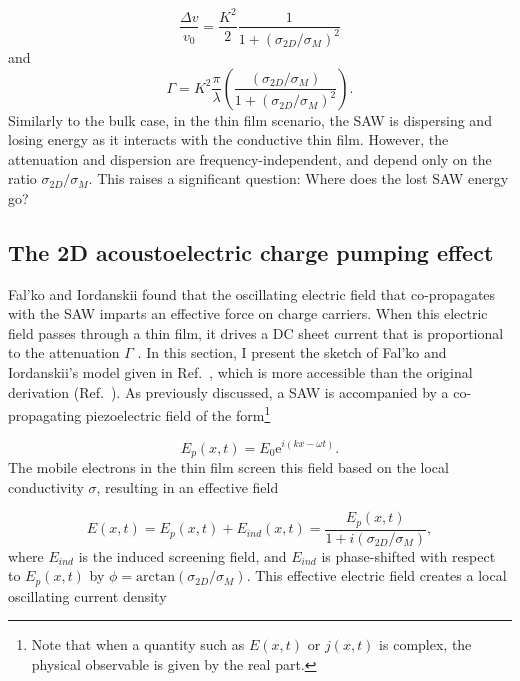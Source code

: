 \documentclass[double,12pt,1in,seploa]{beavtex}
\let\Oldsubsection\subsection
\renewcommand{\subsection}{\FloatBarrier\Oldsubsection}
\begin{document}
\begin{equation}
    \frac{\Delta v}{v_0} = \frac{K^2}{2}\frac{1}{1+(\sigma_{2D}/\sigma_M)^2} \label{v_2D}
\end{equation}
and
\begin{equation}
    \Gamma = K^2 \frac{\pi}{\lambda}\left(\frac{(\sigma_{2D}/\sigma_M)}{1+(\sigma_{2D}/\sigma_M)^2}\right). \label{gamma_2D}
\end{equation}
Similarly to the bulk case, in the thin film scenario, the SAW is dispersing and losing energy as it interacts with the conductive thin film. However, the attenuation and dispersion are frequency-independent, and depend only on the ratio $\sigma_{2D}/\sigma_M$. This raises a significant question: Where does the lost SAW energy go? 


\subsection{The 2D acoustoelectric charge pumping effect} \label{classical relaxtion model}

Fal'ko and Iordanskii found that the oscillating electric field that co-propagates with the SAW imparts an effective force on charge carriers. When this electric field passes through a thin film, it drives a DC sheet current that is proportional to the attenuation $\Gamma$ \cite{falko_acoustoelectric_1993}. In this section, I present the sketch of Fal'ko and Iordanskii's model given in Ref.\ \cite{esslinger_ultrasonic_1994}, which is more accessible than the original derivation (Ref.\ \cite{falko_acoustoelectric_1993}). As previously discussed, a SAW is accompanied by a co-propagating piezoelectric field of the form\footnote{Note that when a quantity such as $E(x,t)$ or $j(x,t)$ is complex, the physical observable is given by the real part.}

\begin{equation}
    E_p(x, t) = E_0 \mathrm{e}^{i(kx - \omega t)}. \label{SAW plane wave}
\end{equation}
The mobile electrons in the thin film screen this field based on the local conductivity $\sigma$, resulting in an effective field

\begin{equation}
    E(x,t) = E_p(x,t) + E_{ind}(x,t) = \frac{E_p(x,t)}{1+i(\sigma_{2D}/\sigma_M)}, \label{E eff}
\end{equation}
where $E_{ind}$ is the induced screening field, and $E_{ind}$ is phase-shifted with respect to $E_p(x,t)$ by $\phi = \mathrm{arctan}(\sigma_{2D}/\sigma_M)$.
This effective electric field creates a local oscillating current density
\end{document}
